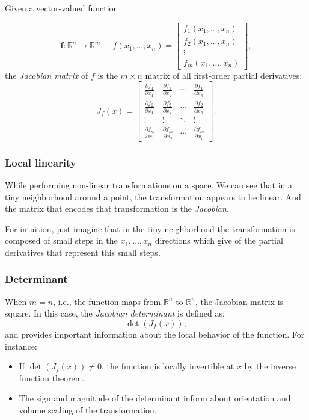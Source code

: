 Given a vector-valued function

\[
\mathbf{f} : \mathbb{R}^n \rightarrow \mathbb{R}^m, \quad f(x_1, \ldots, x_n) = 
\begin{bmatrix}
f_1(x_1, \ldots, x_n) \\
f_2(x_1, \ldots, x_n) \\
\vdots \\
f_m(x_1, \ldots, x_n)
\end{bmatrix},
\]
the \emph{Jacobian matrix} of \(f\) is the \(m \times n\) matrix of all first-order partial derivatives:
\[
J_f(x) = \begin{bmatrix}
\frac{\partial f_1}{\partial x_1} & \frac{\partial f_1}{\partial x_2} & \cdots & \frac{\partial f_1}{\partial x_n} \\
\frac{\partial f_2}{\partial x_1} & \frac{\partial f_2}{\partial x_2} & \cdots & \frac{\partial f_2}{\partial x_n} \\
\vdots & \vdots & \ddots & \vdots \\
\frac{\partial f_m}{\partial x_1} & \frac{\partial f_m}{\partial x_2} & \cdots & \frac{\partial f_m}{\partial x_n}
\end{bmatrix}.
\]

\subsubsection{Local linearity}

While performing non-linear transformations on a space. We can see that in a tiny neighborhood
around a point, the transformation appears to be linear. And the matrix that encodes that
transformation is the \emph{Jacobian}.

For intuition, just imagine that in the tiny neighborhood the transformation is composed
of small steps in the \(x_1, \dots, x_n\) directions which give of the partial derivatives that
represent this small steps. 

\subsubsection{Determinant}
When \(m = n\), i.e., the function maps from 
\(\mathbb{R}^n\) to \(\mathbb{R}^n\), 
the Jacobian matrix is square. In this case, 
the \textit{Jacobian determinant} is defined as:
\[
\det(J_{f}(x)),
\]
and provides important information about the local behavior of the function. For instance:
\begin{itemize}[label=\(-\)]
  \item If \(\det(J_{f}(x)) \neq 0\), the function is locally invertible at \(x\) by the inverse 
  function theorem.
  \item The sign and magnitude of the determinant 
  inform about orientation and volume scaling of the transformation.
\end{itemize}

